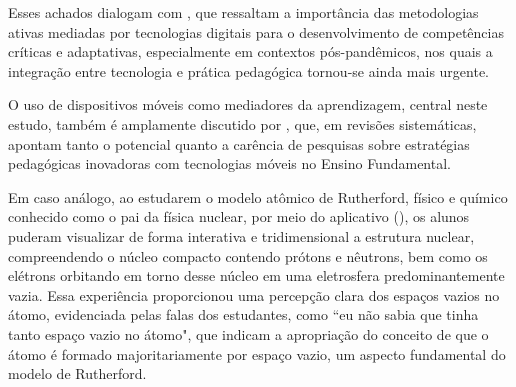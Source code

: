 \documentclass[portuguese]{textolivre}
\begin{document}
Esses achados dialogam com \textcite{nascimento2024}, que ressaltam a importância das metodologias ativas mediadas por tecnologias digitais para o desenvolvimento de competências críticas e adaptativas, especialmente em contextos pós-pandêmicos, nos quais a integração entre tecnologia e prática pedagógica tornou-se ainda mais urgente.

O uso de dispositivos móveis como mediadores da aprendizagem, central neste estudo, também é amplamente discutido por \textcite{nascimento2016, nascimento2017}, que, em revisões sistemáticas, apontam tanto o potencial quanto a carência de pesquisas sobre estratégias pedagógicas inovadoras com tecnologias móveis no Ensino Fundamental.

Em caso análogo, ao estudarem o modelo atômico de Rutherford, físico e químico conhecido como o pai da física nuclear, por meio do aplicativo (), os alunos puderam visualizar de forma interativa e tridimensional a estrutura nuclear, compreendendo o núcleo compacto contendo prótons e nêutrons, bem como os elétrons orbitando em torno desse núcleo em uma eletrosfera predominantemente vazia. Essa experiência proporcionou uma percepção clara dos espaços vazios no átomo, evidenciada pelas falas dos estudantes, como ``eu não sabia que tinha tanto espaço vazio no átomo", que indicam a apropriação do conceito de que o átomo é formado majoritariamente por espaço vazio, um aspecto fundamental do modelo de Rutherford.
\end{document}
